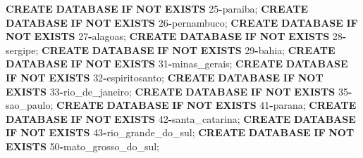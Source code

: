 \documentclass[
]{book}
\newenvironment{Shaded}{\begin{snugshade}}{\end{snugshade}}
\newcommand{\ControlFlowTok}[1]{\textcolor[rgb]{0.13,0.29,0.53}{\textbf{#1}}}
\newcommand{\DecValTok}[1]{\textcolor[rgb]{0.00,0.00,0.81}{#1}}
\newcommand{\KeywordTok}[1]{\textcolor[rgb]{0.13,0.29,0.53}{\textbf{#1}}}
\newcommand{\NormalTok}[1]{#1}
\newcommand{\OperatorTok}[1]{\textcolor[rgb]{0.81,0.36,0.00}{\textbf{#1}}}
\begin{document}
\begin{Shaded}
\begin{Highlighting}[]
\KeywordTok{CREATE} \KeywordTok{DATABASE} \ControlFlowTok{IF} \KeywordTok{NOT} \KeywordTok{EXISTS}\NormalTok{ \textasciigrave{}}\DecValTok{25}\OperatorTok{{-}}\NormalTok{paraiba\textasciigrave{};}
\KeywordTok{CREATE} \KeywordTok{DATABASE} \ControlFlowTok{IF} \KeywordTok{NOT} \KeywordTok{EXISTS}\NormalTok{ \textasciigrave{}}\DecValTok{26}\OperatorTok{{-}}\NormalTok{pernambuco\textasciigrave{};}
\KeywordTok{CREATE} \KeywordTok{DATABASE} \ControlFlowTok{IF} \KeywordTok{NOT} \KeywordTok{EXISTS}\NormalTok{ \textasciigrave{}}\DecValTok{27}\OperatorTok{{-}}\NormalTok{alagoas\textasciigrave{};}
\KeywordTok{CREATE} \KeywordTok{DATABASE} \ControlFlowTok{IF} \KeywordTok{NOT} \KeywordTok{EXISTS}\NormalTok{ \textasciigrave{}}\DecValTok{28}\OperatorTok{{-}}\NormalTok{sergipe\textasciigrave{};}
\KeywordTok{CREATE} \KeywordTok{DATABASE} \ControlFlowTok{IF} \KeywordTok{NOT} \KeywordTok{EXISTS}\NormalTok{ \textasciigrave{}}\DecValTok{29}\OperatorTok{{-}}\NormalTok{bahia\textasciigrave{};}
\KeywordTok{CREATE} \KeywordTok{DATABASE} \ControlFlowTok{IF} \KeywordTok{NOT} \KeywordTok{EXISTS}\NormalTok{ \textasciigrave{}}\DecValTok{31}\OperatorTok{{-}}\NormalTok{minas\_gerais\textasciigrave{};}
\KeywordTok{CREATE} \KeywordTok{DATABASE} \ControlFlowTok{IF} \KeywordTok{NOT} \KeywordTok{EXISTS}\NormalTok{ \textasciigrave{}}\DecValTok{32}\OperatorTok{{-}}\NormalTok{espiritosanto\textasciigrave{};}
\KeywordTok{CREATE} \KeywordTok{DATABASE} \ControlFlowTok{IF} \KeywordTok{NOT} \KeywordTok{EXISTS}\NormalTok{ \textasciigrave{}}\DecValTok{33}\OperatorTok{{-}}\NormalTok{rio\_de\_janeiro\textasciigrave{};}
\KeywordTok{CREATE} \KeywordTok{DATABASE} \ControlFlowTok{IF} \KeywordTok{NOT} \KeywordTok{EXISTS}\NormalTok{ \textasciigrave{}}\DecValTok{35}\OperatorTok{{-}}\NormalTok{sao\_paulo\textasciigrave{};}
\KeywordTok{CREATE} \KeywordTok{DATABASE} \ControlFlowTok{IF} \KeywordTok{NOT} \KeywordTok{EXISTS}\NormalTok{ \textasciigrave{}}\DecValTok{41}\OperatorTok{{-}}\NormalTok{parana\textasciigrave{};}
\KeywordTok{CREATE} \KeywordTok{DATABASE} \ControlFlowTok{IF} \KeywordTok{NOT} \KeywordTok{EXISTS}\NormalTok{ \textasciigrave{}}\DecValTok{42}\OperatorTok{{-}}\NormalTok{santa\_catarina\textasciigrave{};}
\KeywordTok{CREATE} \KeywordTok{DATABASE} \ControlFlowTok{IF} \KeywordTok{NOT} \KeywordTok{EXISTS}\NormalTok{ \textasciigrave{}}\DecValTok{43}\OperatorTok{{-}}\NormalTok{rio\_grande\_do\_sul\textasciigrave{};}
\KeywordTok{CREATE} \KeywordTok{DATABASE} \ControlFlowTok{IF} \KeywordTok{NOT} \KeywordTok{EXISTS}\NormalTok{ \textasciigrave{}}\DecValTok{50}\OperatorTok{{-}}\NormalTok{mato\_grosso\_do\_sul\textasciigrave{};}

\end{Highlighting}
\end{Shaded}
\end{document}
